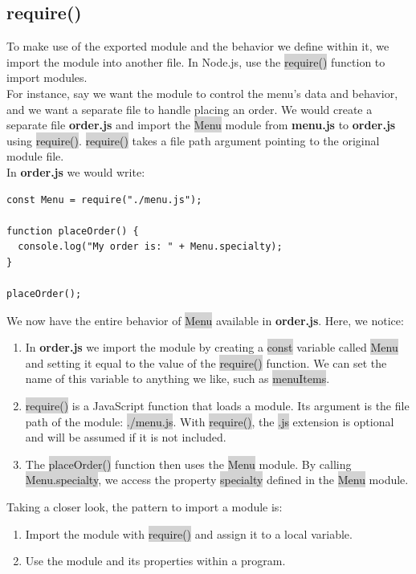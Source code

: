 \documentclass[11pt]{article}
\begin{document}
\subsection{require()}
To make use of the exported module and the behavior we define within it, we import the module into another file. In Node.js, use the \colorbox{lightgray}{require()} function to import modules. \\
\newline
For instance, say we want the module to control the menu’s data and behavior, and we want a separate file to handle placing an order. We would create a separate file \textbf{order.js} and import the \colorbox{lightgray}{Menu} module from \textbf{menu.js} to \textbf{order.js} using \colorbox{lightgray}{require()}. \colorbox{lightgray}{require()} takes a file path argument pointing to the original module file. \\
\newline
In \textbf{order.js} we would write:
\begin{lstlisting}
const Menu = require("./menu.js");

function placeOrder() {
  console.log("My order is: " + Menu.specialty);
}

placeOrder();
\end{lstlisting}
We now have the entire behavior of \colorbox{lightgray}{Menu} available in \textbf{order.js}. Here, we notice:
\begin{enumerate}[leftmargin = *]
\item In \textbf{order.js} we import the module by creating a \colorbox{lightgray}{const} variable called \colorbox{lightgray}{Menu} and setting it equal to the value of the \colorbox{lightgray}{require()} function. We can set the name of this variable to anything we like, such as \colorbox{lightgray}{menuItems}. 
\item \colorbox{lightgray}{require()} is a JavaScript function that loads a module. Its argument is the file path of the module: \colorbox{lightgray}{./menu.js}. With \colorbox{lightgray}{require()}, the \colorbox{lightgray}{.js} extension is optional and will be assumed if it is not included.
\item The \colorbox{lightgray}{placeOrder()} function then uses the \colorbox{lightgray}{Menu} module. By calling \colorbox{lightgray}{Menu.specialty}, we access the property \colorbox{lightgray}{specialty} defined in the \colorbox{lightgray}{Menu} module.
\end{enumerate}
Taking a closer look, the pattern to import a module is:
\begin{enumerate}[leftmargin = *]
\item Import the module with \colorbox{lightgray}{require()} and assign it to a local variable.
\item Use the module and its properties within a program.
\end{enumerate}
\end{document}
